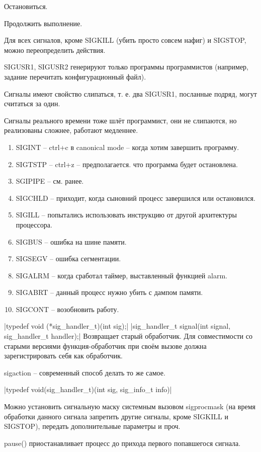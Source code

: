 \documentclass[a4paper,10pt]{article}
\newcommand{\cl}{\mint{c}}
\begin{document}
Остановиться.

Продолжить выполнение.

Для всех сигналов, кроме SIGKILL (убить просто совсем нафиг) и SIGSTOP, можно переопределить действия.

SIGUSR1, SIGUSR2 генерируют только программы программистов (например, задание перечитать конфигурационный файл).

Сигналы имеют свойство слипаться, т. е. два SIGUSR1, посланные подряд, могут считаться за один. 

Сигналы реального времени тоже шлёт программист, они не слипаются, но реализованы сложнее, работают медленнее.

\begin{enumerate}
\item SIGINT -- ctrl+c в canonical mode -- когда хотим завершить программу.
\item SIGTSTP -- ctrl+z -- предполагается. что программа будет остановлена.
\item SGIPIPE -- см. ранее.
\item SIGCHLD -- приходит, когда сыновний процесс завершился или остановился.
\item SIGILL -- попытались использовать инструкцию от другой архитектуры процессора.
\item SIGBUS -- ошибка на шине памяти.
\item SIGSEGV -- ошибка сегментации.
\item SIGALRM -- когда сработал таймер, выставленный функцией alarm.
\item SIGABRT -- данный процесс нужно убить с дампом памяти.
\item SIGCONT -- возобновить работу.
\end{enumerate}

\cl|typedef void (*sig_handler_t)(int sig);|
\cl|sig_handler_t signal(int signal, sig_handler_t handler);|
Возвращает старый обработчик. Для совместимости со старыми версиями функция-обработчик при своём вызове должна зарегистрировать себя как обработчик.

sigaction -- современный способ делать то же самое.

\cl|typedef void(sig_handler_t)(int sig, sig_info_t info)|

Можно установить сигнальную маску системным вызовом sigprocmask (на время обработки данного сигнала запретить другие сигналы, кроме SIGKILL и SIGSTOP), передать дополнительные параметры и проч.

pause() приостанавливает процесс до прихода первого попавшегося сигнала.
\end{document}
